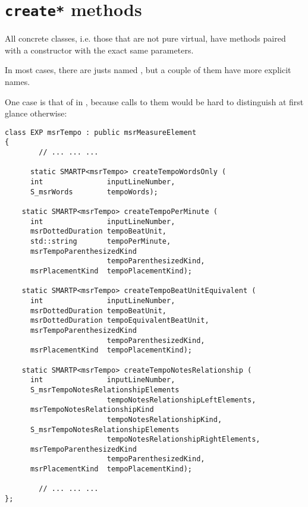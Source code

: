 \section{{\tt create*} methods}%

All concrete classes, i.e. those that are not pure virtual, have  methods paired with a constructor with the exact same parameters.

In most cases, there are justs named , but a couple of them have more explicit names.

One case is that of  in , because calls to them would be hard to distinguish at first glance otherwise:
\begin{lstlisting}[language=CPlusPlus]
 class EXP msrTempo : public msrMeasureElement
{
 		// ... ... ...

	  static SMARTP<msrTempo> createTempoWordsOnly (
      int               inputLineNumber,
      S_msrWords        tempoWords);

    static SMARTP<msrTempo> createTempoPerMinute (
      int               inputLineNumber,
      msrDottedDuration tempoBeatUnit,
      std::string       tempoPerMinute,
      msrTempoParenthesizedKind
                        tempoParenthesizedKind,
      msrPlacementKind  tempoPlacementKind);

    static SMARTP<msrTempo> createTempoBeatUnitEquivalent (
      int               inputLineNumber,
      msrDottedDuration tempoBeatUnit,
      msrDottedDuration tempoEquivalentBeatUnit,
      msrTempoParenthesizedKind
                        tempoParenthesizedKind,
      msrPlacementKind  tempoPlacementKind);

    static SMARTP<msrTempo> createTempoNotesRelationship (
      int               inputLineNumber,
      S_msrTempoNotesRelationshipElements
                        tempoNotesRelationshipLeftElements,
      msrTempoNotesRelationshipKind
                        tempoNotesRelationshipKind,
      S_msrTempoNotesRelationshipElements
                        tempoNotesRelationshipRightElements,
      msrTempoParenthesizedKind
                        tempoParenthesizedKind,
      msrPlacementKind  tempoPlacementKind);

		// ... ... ...
};
\end{lstlisting}

